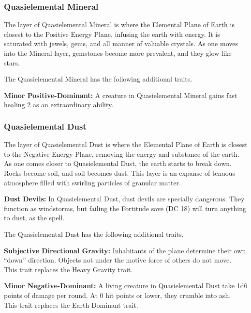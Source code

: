 \subsubsection{Quasielemental Mineral}
The layer of Quasielemental Mineral is where the Elemental Plane of Earth is closest to the Positive Energy Plane, infusing the earth with energy. It is saturated with jewels, gems, and all manner of valuable crystals. As one moves into the Mineral layer, gemstones become more prevalent, and they glow like stars.

The Quasielemental Mineral has the following additional traits.
\begin{itemize*}
\item \textbf{Minor Positive-Dominant:} A creature in Quasielemental Mineral gains fast healing 2 as an extraordinary ability.
\end{itemize*}

\subsubsection{Quasielemental Dust}
The layer of Quasielemental Dust is where the Elemental Plane of Earth is closest to the Negative Energy Plane, removing the energy and substance of the earth. As one comes closer to Quasielemental Dust, the earth starts to break down. Rocks become soil, and soil becomes dust. This layer is an expanse of tenuous atmosphere filled with swirling particles of granular matter.

\textbf{Dust Devils:} In Quasielemental Dust, dust devils are specially dangerous. They function as windstorms, but failing the Fortitude save (DC 18) will turn anything to dust, as the  spell.

The Quasielemental Dust has the following additional traits.
\begin{itemize*}
\item \textbf{Subjective Directional Gravity:} Inhabitants of the plane determine their own ``down'' direction. Objects not under the motive force of others do not move.\\

This trait replaces the Heavy Gravity trait.
\item \textbf{Minor Negative-Dominant:} A living creature in Quasielemental Dust take 1d6 points of damage per round. At 0 hit points or lower, they crumble into ash.\\

This trait replaces the Earth-Dominant trait.
\end{itemize*}
